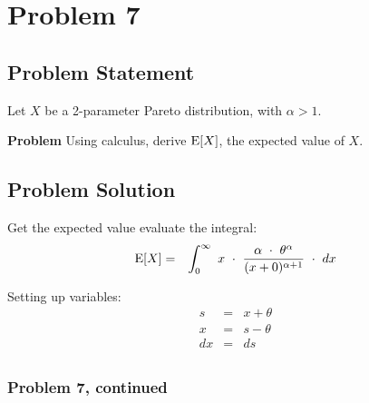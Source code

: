\documentclass[12pt]{article}
\theoremstyle{definition}
\begin{document}
\newpage
\section*{Problem 7}


\subsection*{Problem Statement}

Let $X$ be a 2-parameter Pareto distribution, with $\alpha > 1$.

\bigskip
\noindent
{\bf Problem} Using calculus, derive $\hbox{E}[X]$, the expected value of $X$.


\subsection*{Problem Solution}

Get the expected value evaluate the integral:
\begin{eqnarray*}
\hbox{E}[X] & = & \int_0^\infty \ x \ \cdot \ \frac{\alpha \ \cdot \ \theta^\alpha}{(x + 0)^{\alpha + 1}} \ \cdot \ dx\\
\end{eqnarray*}

Setting up variables:
\begin{eqnarray*}
s & = & x + \theta \\
x & = & s - \theta \\
dx & = & ds \\
\end{eqnarray*}



\newpage
\subsubsection*{Problem 7, continued}
\end{document}
